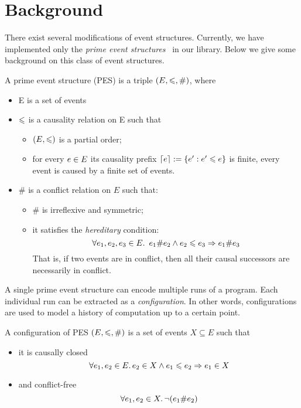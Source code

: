 \section{Background}

There exist several modifications of event structures.
Currently, we have implemented only 
the \emph{prime event structures}~\cite{Winskel:86} in our library. 
Below we give some background on this class of event structures. 

\begin{definition} 
\label{es_def}
A prime event structure (PES) is a triple $(E, \leqslant, \#)$, where
\begin{itemize}
  \item E is a set of events
  \item $\leqslant$ is a causality relation on E such that 
  \begin{itemize}
    \item $ (E, \leqslant) $ is a partial order;
    \item for every $e \in E$ its causality prefix ${\lceil e \rceil := \{ e' : e' \leqslant e \}}$ 
      is finite, \ie every event is caused by a finite set of events.
  \end{itemize}
  \item $\#$ is a conflict relation on $E$ such that:
  \begin{itemize}
    \item $\#$ is irreflexive and symmetric;
    \item it satisfies the \emph{hereditary} condition:
    $$ \forall e_1, e_2, e_3 \in E \ldotp \ e_1 \# e_2 \land e_2 \leqslant e_3 \Rightarrow e_1 \# e_3 $$
      That is, if two events are in conflict, then all their causal successors 
      are necessarily in conflict.
  \end{itemize}
\end{itemize}
\end{definition}

A single prime event structure can encode multiple runs of a program.
Each individual run can be extracted as a \emph{configuration}. 
In other words, configurations are used to model 
a history of computation up to a certain point.

\begin{definition}
A configuration of PES $(E, \leqslant, \#)$ is a set of events $X \subseteq E$ such that
\begin{itemize}
  \item it is causally closed 
    $$ \forall e_1, e_2 \in E \ldotp e_2 \in X \land e_1 \leqslant e_2 \Rightarrow e_1 \in X $$
  \item and conflict-free 
    $$ \forall e_1, e_2 \in X \ldotp \neg (e_1 \# e_2) $$
\end{itemize}
\end{definition}

